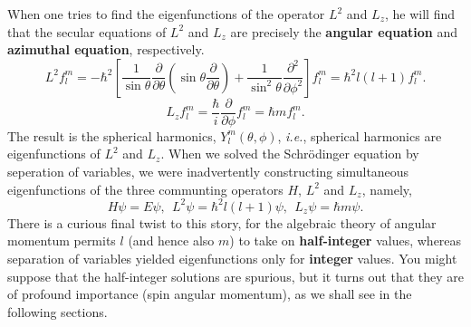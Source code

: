 \documentclass[12pt, 
]{article}
\begin{document}
\noindent When one tries to find the eigenfunctions of the operator $L^2$ and $L_z$, he will find that the secular equations of $L^2$ and $L_z$ are precisely the {\bf angular equation} and {\bf azimuthal equation}, respectively.
\[
	L^2f_l^m=-\hbar^2\left[\frac{1}{\sin\theta}\frac{\partial}{\partial\theta}\left(\sin\theta\frac{\partial}{\partial\theta}\right)+\frac{1}{\sin^2\theta}\frac{\partial^2}{\partial\phi^2}\right]f_l^m=\hbar^2l(l+1)f_l^m.
\]
\[
	L_zf_l^m=\frac{\hbar}{i}\frac{\partial}{\partial\phi}f_l^m=\hbar mf_l^m.
\]
The result is the spherical harmonics, $Y_l^m(\theta,\phi)$, {\it i.e.}, spherical harmonics are eigenfunctions of $L^2$ and $L_z$. When we solved the Schr\"odinger equation by seperation of variables, we were inadvertently constructing simultaneous eigenfunctions of the three communting operators $H$, $L^2$ and $L_z$, namely,
\[
	H\psi=E\psi,~~L^2\psi=\hbar^2l(l+1)\psi,~~L_z\psi=\hbar m\psi.
\]
There is a curious final twist to this story, for the algebraic theory of angular momentum permits $l$ (and hence also $m$) to take on {\bf half-integer} values, whereas separation of variables yielded eigenfunctions only for {\bf integer} values. You might suppose that the half-integer solutions are spurious, but it turns out that they are of profound importance (spin angular momentum), as we shall see in the following sections.
\end{document}
